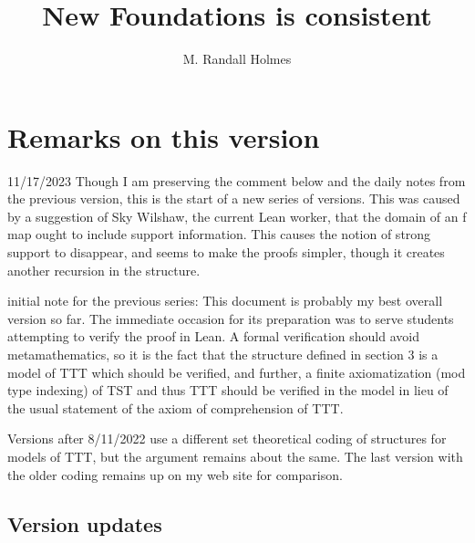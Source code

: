 \documentclass[112pt]{article}
\title{New Foundations is consistent}
\author{M. Randall Holmes}
\begin{document}
\maketitle

\tableofcontents

\newpage


\newpage

\section{Remarks on this version}

11/17/2023  Though I am preserving the comment below and the daily notes from the previous version, this is the start of a new series of versions.  This was caused by a suggestion of Sky Wilshaw, the current Lean worker, that the domain of an f map ought to include support information.  This causes the notion of strong support to disappear, and seems to 
make the proofs simpler, though it creates another recursion in the structure.

initial note for the previous series:  This document is probably my best overall version so far.  The immediate occasion for its preparation was to serve students attempting to verify the proof in Lean.  A formal verification should avoid metamathematics, so it is the fact that the structure defined in section 3 is a model of TTT which should be verified, and further, a finite axiomatization (mod type indexing) of TST and thus TTT should be verified in the model in lieu of the usual statement of the axiom of comprehension of TTT.

Versions after 8/11/2022 use a different set theoretical coding of structures for models of TTT, but the argument remains about the same.  The last version with the older coding remains up on my web site for comparison.


\subsection{Version updates}
\end{document}
